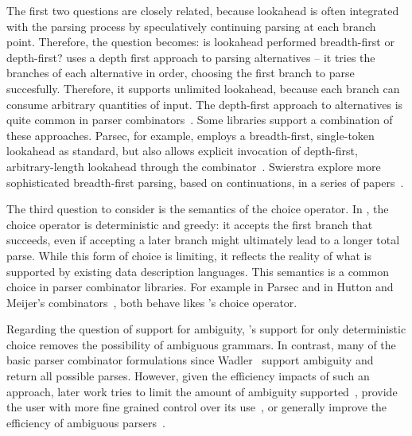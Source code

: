 The first two questions are closely related, because lookahead is often integrated with the parsing process by speculatively continuing parsing at each branch point. Therefore, the question becomes: is lookahead performed breadth-first or depth-first? \ddc{} uses a depth first approach to parsing alternatives -- it tries the branches of each alternative in order, choosing the first branch to parse succesfully. Therefore, it supports unlimited lookahead, because each branch can consume arbitrary quantities of input. The depth-first approach to alternatives is quite common in parser combinators~\cite{wadler:failure-successes,hutton:higher-order-parsing,hutton+:monadic-parsing,fokker:functional-parsers}. Some libraries support a combination of these approaches. Parsec, for example, employs a breadth-first, single-token lookahead as standard, but also allows explicit invocation of depth-first, arbitrary-length lookahead through the  combinator~\cite{leijen+:parsec}. Swierstra \etal{} explore more sophisticated breadth-first parsing, based on continuations, in a series of papers~\cite{swierstra+:fast-error-correcting,swierstra:toys-parsing,hughes+:polish-parsing}.

The third question to consider is the semantics of the choice operator. In \ddc{}, the choice operator is deterministic and greedy: it accepts the first branch that succeeds, even if accepting a later branch might ultimately lead to a longer total parse. While this form of choice is limiting, it reflects the reality of what is supported by existing data description languages. 
This semantics is a common choice in parser combinator libraries.  
For example  in Parsec and  in Hutton and 
Meijer's combinators~\cite{hutton+:monadic-parsing}, both behave likes 
\ddc{}'s choice operator.

Regarding the question of support for ambiguity, \ddc{}'s support for only deterministic choice removes the possibility of ambiguous grammars. In contrast, many of the basic parser combinator formulations since Wadler~\cite{wadler:failure-successes} support ambiguity and return all possible parses. However, given the efficiency impacts of such an approach, later work tries to limit the amount of ambiguity supported~\cite{swierstra+:deterministic-error-correcting,leijen+:parsec}, provide the user with more fine grained control over its use~\cite{hughes+:polish-parsing}, or generally improve the efficiency of ambiguous parsers~\cite{peake+:earley-cps,frost+:padl-pcombs}.

